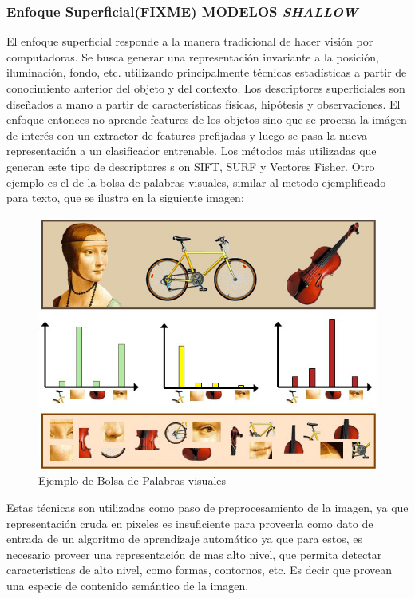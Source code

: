 \documentclass[a4paper,11pt,spanish]{book}
\newcommand*{\FIXME}[1]{{(\textbf{FIXME}) {#1}}}
\begin{document}
	\subsubsection{Enfoque Superficial\FIXME{MODELOS \emph{SHALLOW}}}
	  El enfoque superficial responde a la manera tradicional de hacer visión por computadoras. Se busca generar una representación invariante a la posición, iluminación, fondo,
	  etc. utilizando principalmente técnicas estadísticas a partir de conocimiento anterior del objeto y del contexto. Los descriptores superficiales son diseñados a mano a
	  partir de características físicas, hipótesis y observaciones. El enfoque entonces no aprende features de los objetos sino que se procesa la imágen de interés con un
	  extractor de features prefijadas y luego se pasa la nueva representación a un clasificador entrenable. Los métodos más utilizadas que generan este tipo de descriptores s
	  on SIFT, SURF y Vectores Fisher.
	  Otro ejemplo es el de la bolsa de palabras visuales, similar al metodo ejemplificado para texto, que se ilustra en la siguiente imagen:\\
	  \begin{figure}[h]
	    \includegraphics[scale=0.5]{./img/bag_of_visual_words.jpg}
	    \caption{Ejemplo de Bolsa de Palabras visuales}
	    \label{fig:bovw}
	  \end{figure}

	  Estas técnicas son utilizadas como paso de preprocesamiento de la imagen, ya que representación cruda en pixeles es insuficiente para proveerla como dato de entrada de un algoritmo
	  de aprendizaje automático ya que para estos, es necesario proveer una representación de mas alto nivel, que permita detectar caracteristicas de alto nivel,
	  como formas, contornos, etc. Es decir que provean una especie de contenido semántico de la imagen.
\end{document}
